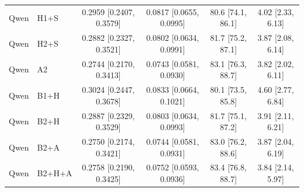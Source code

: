 \begin{table}[h]
{\begin{tabular}{llcccc}
Qwen & H1+S & 0.2959 [0.2407, 0.3579] & 0.0817 [0.0655, 0.0995] & 80.6 [74.1, 86.1] & 4.02 [2.33, 6.13] \\
Qwen & H2+S & 0.2882 [0.2327, 0.3521] & 0.0802 [0.0634, 0.0991] & 81.7 [75.2, 87.1] & 3.87 [2.08, 6.14] \\
Qwen & A2 & 0.2744 [0.2170, 0.3413] & 0.0743 [0.0581, 0.0930] & 83.1 [76.3, 88.7] & 3.82 [2.02, 6.11] \\
Qwen & B1+H & 0.3024 [0.2447, 0.3678] & 0.0833 [0.0664, 0.1021] & 80.1 [73.5, 85.8] & 4.60 [2.77, 6.84] \\
Qwen & B2+H & 0.2887 [0.2329, 0.3529] & 0.0803 [0.0634, 0.0993] & 81.7 [75.1, 87.2] & 3.91 [2.11, 6.21] \\
Qwen & B2+A & 0.2750 [0.2174, 0.3421] & 0.0744 [0.0581, 0.0931] & 83.0 [76.2, 88.6] & 3.87 [2.04, 6.19] \\
Qwen & B2+H+A & 0.2758 [0.2190, 0.3425] & 0.0752 [0.0593, 0.0936] & 83.4 [76.8, 88.7] & 3.84 [2.14, 5.97] \\
\bottomrule
\end{tabular}
}
\end{table}

